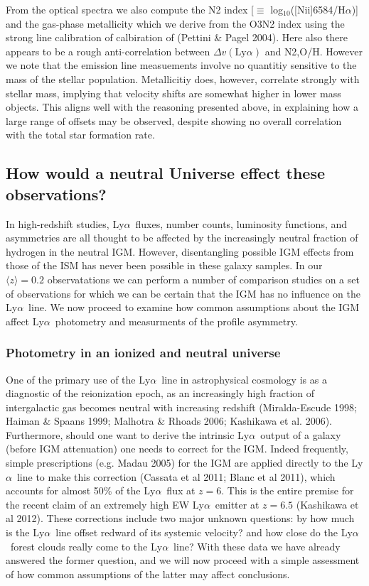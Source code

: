 \documentclass[manuscript]{emulateapj}
\newcommand{\lya}{Ly$\alpha$}
\newcommand{\ha}{H$\alpha$}
\newcommand{\nII}{[N{\sc ii}]}
\begin{document}
From the optical spectra we also compute the N2 index 
[$\equiv$ log$_{10}$(\nII6584/\ha)] and the gas-phase metallicity which we derive 
from the O3N2 index using the strong line calibration of calbiration of 
(Pettini \& Pagel 2004). Here also there appears to be a rough anti-correlation 
between $\Delta v(\mathrm{Ly}\alpha)$ and {N2,O/H}. However we note that the 
emission line measuements involve no quantitiy sensitive to the mass of the stellar 
population. Metallicitiy does, however, correlate strongly with stellar mass, 
implying that velocity shifts are somewhat higher in lower mass objects. 
This aligns well with the reasoning presented above, in explaining how a large 
range of offsets may be observed, despite showing no overall correlation with 
the total star formation rate. 

\subsection{How would a neutral Universe effect these observations?}

In high-redshift studies, \lya\ fluxes, number counts, luminosity functions, 
and asymmetries are all thought to be affected by the increasingly neutral 
fraction of hydrogen in the neutral IGM. However, disentangling possible IGM
effects from those of the ISM has never been possible in these galaxy samples. 
In our $\langle z\rangle=0.2$ observatations we can perform a number of 
comparison studies on a set of observations for which we can be certain that 
the IGM has no influence on the \lya\ line. We now proceed to examine how 
common assumptions about the IGM affect \lya\ photometry and measurments of the 
profile asymmetry. 


\subsubsection{Photometry in an ionized and neutral universe}

One of the primary use of the \lya\ line in astrophysical cosmology is as a 
diagnostic of the reionization epoch, as an increasingly high fraction of 
intergalactic gas becomes neutral with increasing redshift 
(Miralda-Escude 1998; Haiman \& Spaans 1999; Malhotra \& Rhoads 2006; 
Kashikawa et al. 2006). Furthermore, should one want to derive the 
intrinsic \lya\ output of a galaxy (before IGM attenuation) one needs to
correct for the IGM. Indeed frequently, simple prescriptions (e.g. Madau 2005) 
for the IGM are applied directly to the \lya\ line to make this correction 
(Cassata et al 2011; Blanc et al 2011), which accounts for almost 50\% of the 
\lya\ flux at $z=6$. This is the entire premise for the recent claim of an 
extremely high EW \lya\ emitter at $z=6.5$ (Kashikawa et al 2012). 
These corrections include two major unknown questions: 
by how much is the \lya\ line offset redward of its systemic velocity? and 
how close do the \lya\ forest clouds really come to the \lya\ line? With these
data we have already answered the former question, and we will now proceed with
a simple assessment of how common assumptions of the latter may affect 
conclusions. 
\end{document}
